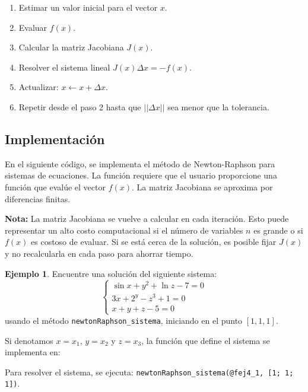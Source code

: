 \documentclass[12pt,letterpaper]{article}
\theoremstyle{definition}
\newtheorem{ejemplo}{Ejemplo}[section]
\theoremstyle{plain}
\theoremstyle{remark}
\begin{document}
\begin{enumerate}
    \item Estimar un valor inicial para el vector $x$.
    \item Evaluar $f(x)$.
    \item Calcular la matriz Jacobiana $J(x)$.
    \item Resolver el sistema lineal $J(x)\Delta x = -f(x)$.
    \item Actualizar: $x \leftarrow x + \Delta x$.
    \item Repetir desde el paso 2 hasta que $||\Delta x||$ sea menor que la tolerancia.
\end{enumerate}

\subsection*{Implementación}

En el siguiente código, se implementa el método de Newton-Raphson para sistemas de ecuaciones. La función requiere que el usuario proporcione una función que evalúe el vector $f(x)$. La matriz Jacobiana se aproxima por diferencias finitas.





{\bf Nota:} La matriz Jacobiana se vuelve a calcular en cada iteración. Esto puede representar un alto costo computacional si el número de variables $n$ es grande o si $f(x)$ es costoso de evaluar. Si se está cerca de la solución, es posible fijar $J(x)$ y no recalcularla en cada paso para ahorrar tiempo.

\begin{ejemplo}
Encuentre una solución del siguiente sistema:
\[
\left\lbrace
\begin{array}{l}
\sin x + y^2 + \ln z - 7 = 0\\
3x + 2^y - z^3 + 1 = 0\\
x + y + z - 5 = 0
\end{array}
\right.
\]
usando el método {\tt newtonRaphson\_sistema}, iniciando en el punto $[1, 1, 1]$.
\end{ejemplo}

Si denotamos $x = x_1$, $y = x_2$ y $z = x_3$, la función que define el sistema se implementa en:



Para resolver el sistema, se ejecuta: \texttt{newtonRaphson\_sistema(@fej4\_1, [1; 1; 1])}.
\end{document}
